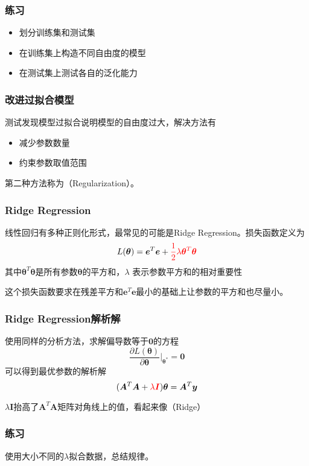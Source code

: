 \documentclass[14pt]{beamer}
\newcommand{\mat}[1]{\bm{#1}}
\renewcommand{\vec}[1]{\bm{#1}}
\newcommand{\MA}{\mat{A}}
\newcommand{\MI}{\mat{I}}
\newcommand{\Vy}{\vec{y}}
\newcommand{\Ve}{\vec{e}}
\newcommand{\Vt}{\vec{\theta}}
\let\emph\relax %
\begin{document}
    \begin{frame}
        \frametitle{练习}
        \begin{itemize}
            \item 划分训练集和测试集
            \item 在训练集上构造不同自由度的模型
            \item 在测试集上测试各自的泛化能力
        \end{itemize}
    \end{frame}

    \begin{frame}
        \frametitle{改进过拟合模型}
        测试发现模型过拟合说明模型的自由度过大，解决方法有
        \begin{itemize}
            \item 减少参数数量
            \item 约束参数取值范围
        \end{itemize}
        第二种方法称为\emph{正则化}（Regularization）。
    \end{frame}

    \begin{frame}
        \frametitle{Ridge Regression}
        线性回归有多种正则化形式，最常见的可能是Ridge Regression。损失函数定义为
        \begin{equation}
            L(\Vt)=\Ve^T\Ve+{\color{red}\frac{1}{2}\lambda\Vt^T\Vt}
        \end{equation}
        其中$\Vt^T\Vt$是所有参数$\Vt$的平方和，$\lambda$
        表示参数平方和的相对重要性

        这个损失函数要求在残差平方和$\Ve^T\Ve$最小的基础上让参数的平方和也尽量小。
    \end{frame}

    \begin{frame}
        \frametitle{Ridge Regression解析解}
        使用同样的分析方法，求解偏导数等于$\vec{0}$的方程
        \begin{equation}
            \frac{\partial L(\Vt)}{\partial\Vt}\bigg|_{\Vt^*}=\vec{0}
        \end{equation}
        可以得到最优参数的解析解
        \begin{equation}
            (\MA^T\MA+{\color{red}\lambda\MI})\Vt=\MA^T\Vy
        \end{equation}

        $\lambda\MI$抬高了$\MA^T\MA$矩阵对角线上的值，看起来像\emph{山脊}（Ridge）
    \end{frame}

    \begin{frame}
        \frametitle{练习}
        使用大小不同的$\lambda$拟合数据，总结规律。
    \end{frame}
\end{document}
